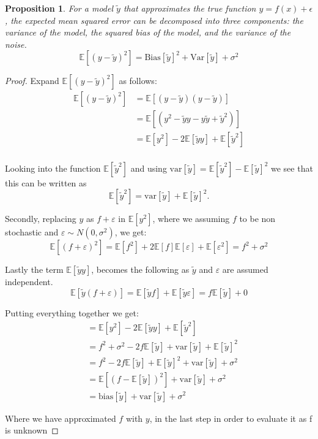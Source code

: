 \documentclass[twocolumn,aps]{revtex4}
\newtheorem{prop}{Proposition}[section]
\begin{document}
\begin{prop}
For a model $\tilde{y}$ that approximates the true function $y=f(x)+\epsilon$, the expected mean squared error can be decomposed into three components: the variance of the model, the squared bias of the model, and the variance of the noise.
$$\mathbb{E}[(y-\tilde{y})^2]=\mathrm{Bias}[\tilde{y}]^2+\mathrm{Var}[\tilde{y}]+\sigma^2$$
\label{prop:BiasVarianceDecomp}
\end{prop}

\begin{proof}

Expand $\mathbb{E}[(y-\tilde{y})^2]$ as follows:
\begin{align*}
\mathbb{E}[(y-\tilde{y})^2 ]&= \mathbb{E}[(y-\tilde{y}) (y-\tilde{y}) ] \\
&= \mathbb{E}[(y^2-\tilde{y} y -y \tilde{y} +\tilde{y}^2)] \\
&= \mathbb{E}[y^2] - 2 \mathbb{E}[\tilde{y} y] +\mathbb{E}[\tilde{y}^2] \\
\end{align*}

Looking into the function $\mathbb{E}[\tilde{y}^2]$ and using $\mathrm{var}[\tilde{y}] = \mathbb{E}[\tilde{y}^2] - \mathbb{E}[\tilde{y}]^2$ we see that this can be written as
$$
\mathbb{E}[\tilde{y}^2] = \mathrm{var}[\tilde{y}] + \mathbb{E}[\tilde{y}]^2.
$$

Secondly, replacing $y$ as $f + \varepsilon$ in $\mathbb{E}[y^2]$, where we assuming $f$ to be non stochastic and $\varepsilon \sim N(0, \sigma^2)$, we get:
$$
\mathbb{E}[(f+\varepsilon)^2] = \mathbb{E}[f^2] + 2 \mathbb{E}[f]\mathbb{E}[\varepsilon] + \mathbb{E}[\varepsilon^2] =  f^2 + \sigma^2
$$

Lastly the term $\mathbb{E}[\tilde{y} y]$, becomes the following as $\tilde{y}$ and $\varepsilon$ are assumed independent.
$$
\mathbb{E}[\tilde{y} (f + \varepsilon)] = \mathbb{E}[\tilde{y} f] + \mathbb{E}[\tilde{y} \varepsilon] = f \mathbb{E}[\tilde{y}] + 0
$$

Putting everything together we get:
\begin{align*}
&=\mathbb{E}[y^2] - 2 \mathbb{E}[\tilde{y} y] +\mathbb{E}[\tilde{y}^2] \\
&= f^2 + \sigma^2 - 2 f \mathbb{E}[\tilde{y}] +\mathrm{var}[\tilde{y}] + \mathbb{E}[\tilde{y}]^2 \\
&= f^2 - 2 f \mathbb{E}[\tilde{y}] + \mathbb{E}[\tilde{y}]^2 + \mathrm{var}[\tilde{y}] + \sigma^2 \\
&= \mathbb{E}[ (f - \mathbb{E}[\tilde{y}])^2] + \mathrm{var}[\tilde{y}] + \sigma^2 \\
&= \mathrm{bias}[\tilde{y}]  + \mathrm{var}[\tilde{y}] + \sigma^2 \
\end{align*}

Where we have approximated $f$ with $y$, in the last step in order to evaluate it as f is unknown
\end{proof}
\end{document}
